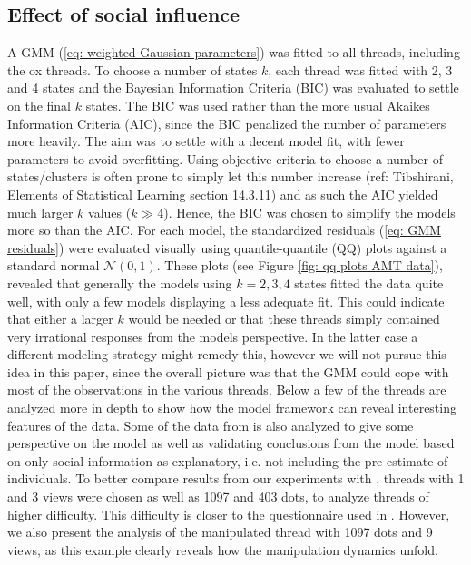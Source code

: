 \documentclass[10pt,a4paper,twocolumn,lineno]{article}
\begin{document}
\subsection{Effect of social influence}
A GMM (\ref{eq: weighted Gaussian parameters}) was fitted to all threads, including the ox threads. To choose a number of states $k$, each thread was fitted with 2, 3 and 4 states  and the Bayesian Information Criteria (BIC) was evaluated to settle on the final $k$ states. The BIC was used rather than the more usual Akaikes Information Criteria (AIC), since the BIC penalized the number of parameters more heavily. The aim was to settle with a decent model fit, with fewer parameters to avoid overfitting. Using objective criteria to choose a number of states/clusters is often prone to simply let this number increase (ref: Tibshirani, Elements of Statistical Learning section 14.3.11) and as such the AIC yielded much larger $k$ values ($k \gg 4$).  Hence, the BIC was chosen to simplify the models more so than the AIC. 
For each model, the standardized residuals (\ref{eq: GMM residuals}) were evaluated visually using quantile-quantile (QQ) plots against a standard normal $\mathcal{N}(0,1)$. These plots (see Figure \ref{fig: qq plots AMT data}), revealed that generally the models using $k=2,3,4$ states fitted the data quite well, with only a few models displaying a less adequate fit. This could indicate that either a larger $k$ would be needed or that these threads simply contained very irrational responses from the models perspective. In the latter case a different modeling strategy might remedy this, however we will not pursue this idea in this paper, since the overall picture was that the GMM could cope with most of the observations in the various threads. Below a few of the threads are analyzed more in depth to show how the model framework can reveal interesting features of the data. Some of the data from \citep{jayles2017social} is also analyzed to give some perspective on the model as well as validating conclusions from the model based on only social information as explanatory, i.e. not including the pre-estimate of individuals. To better compare results from our experiments with \citep{jayles2017social}, threads with 1 and 3 views were chosen as well as 1097 and 403 dots, to analyze threads of higher difficulty. This difficulty is closer to the questionnaire used in \citep{jayles2017social}. However, we also present the analysis of the manipulated thread with 1097 dots and 9 views, as this example clearly reveals how the manipulation dynamics unfold. 
\end{document}
